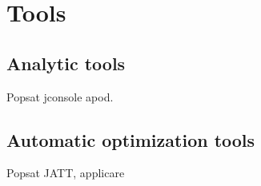 \documentclass[
  digital, %
  oneside,
  notable, %
  nolof,     %
  nolot     %
]{fithesis3}
\begin{document}
\chapter{Tools}
\section{Analytic tools}
{\color{red} Popsat jconsole apod.}
\section{Automatic optimization tools}\label{autoopt}

{\color{red} Popsat JATT, applicare}








\end{document}

